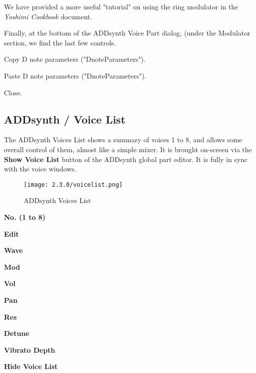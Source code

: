    We have provided a more useful "tutorial" on using the ring modulator in the
   \textsl{Yoshimi Cookbook} \cite{cookbook} document.

   Finally, at the bottom of the ADDsynth Voice Part dialog, (under the Modulator
   section, we find the last few controls.

   \setcounter{ItemCounter}{0}      %

   Copy D note parameters ("DnoteParameters").

   Paste D note parameters ("DnoteParameters").

   Close.


\subsection{ADDsynth / Voice List}
\label{subsec:addsynth_voice_list}

   The ADDsynth Voices List shows a summary of voices 1 to 8, and allows
   some overall control of them, almost like a simple mixer.
   It is brought on-screen via the \textbf{Show Voice List} button
   of the ADDsynth global part editor.
   It is fully in sync with the voice windows.

\begin{figure}[H]
   \centering
   \texttt{[image: 2.3.0/voicelist.png]}
   \caption{ADDsynth Voices List}
   \label{fig:addsynth_voices_list}
\end{figure}

   \begin{enumber}
      \item \textbf{No. (1 to 8)}
      \item \textbf{Edit}
      \item \textbf{Wave}
      \item \textbf{Mod}
      \item \textbf{Vol}
      \item \textbf{Pan}
      \item \textbf{Res}
      \item \textbf{Detune}
      \item \textbf{Vibrato Depth}
      \item \textbf{Hide Voice List}
   \end{enumber}

   \setcounter{ItemCounter}{0}      %

